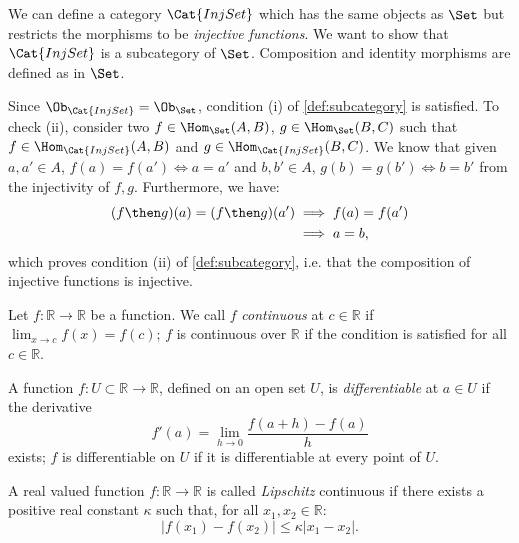 \begin{example}
We can define a category $\Cat{InjSet}$ which has the same objects as $\Set$ but restricts the morphisms to be \emph{injective functions}.
We want to show that $\Cat{InjSet}$ is a subcategory of $\Set$. Composition and identity morphisms are defined as in $\Set$.

Since $\Ob_{\Cat{InjSet}}=\Ob_{\Set}$, condition (i) of \cref{def:subcategory} is satisfied. To check (ii), consider two $f\in \Hom_\Set(A,B)$, $g\in \Hom_\Set(B,C)$ such that $f\in \Hom_\Cat{InjSet}(A,B)$ and $g\in \Hom_\Cat{InjSet}(B,C)$. We know that given $a,a'\in A$, $f(a)=f(a') \Leftrightarrow a=a'$ and $b,b'\in A$, $g(b)=g(b') \Leftrightarrow b=b'$ from the injectivity of $f,g$. Furthermore, we have:
\begin{equation*}
    \begin{aligned}
    (f\then g)(a)=(f\then g)(a')&\implies f(a)=f(a')\\
    &\implies a=b,
    \end{aligned}
\end{equation*}
which proves condition (ii) of \cref{def:subcategory}, i.e. that the composition of injective functions is injective.
\end{example}


\begin{definition}
Let $f\colon \mathbb{R}\to \mathbb{R}$ be a function. We call $f$ \emph{continuous} at $c\in \mathbb{R}$ if $\lim_{x\to c}f(x)=f(c)$; $f$ is continuous over $\mathbb{R}$ if the condition is satisfied for all $c\in \mathbb{R}$.
\end{definition}

\begin{definition}
A function $f\colon U\subset \mathbb{R}\to \mathbb{R}$, defined on an open set $U$, is \emph{differentiable} at $a\in U$ if the derivative
\begin{equation}
    f'(a)=\lim_{h\to 0} \frac{f(a+h)-f(a)}{h}
\end{equation}
exists; $f$ is differentiable on $U$ if it is differentiable at every point of $U$.
\end{definition}



\begin{definition}
A real valued function $f\colon \mathbb{R}\to \mathbb{R}$ is called \emph{Lipschitz} continuous if there exists a positive real constant $\kappa$ such that, for all $x_1,x_2\in \mathbb{R}$:
\begin{equation}
    \vert f(x_1)-f(x_2)\vert \leq \kappa \vert x_1-x_2\vert.
\end{equation}
\end{definition}


